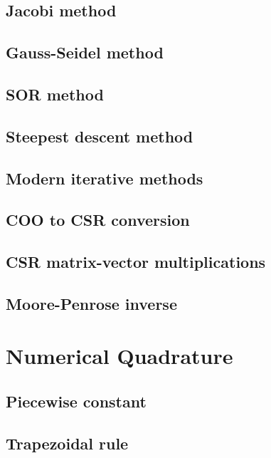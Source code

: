 \documentclass[article,A4,12pt]{llncs}
\begin{document}
\subsection{Jacobi method}


\subsection{Gauss-Seidel method}


\subsection{SOR method}


\subsection{Steepest descent method}


\subsection{Modern iterative methods}


\subsection{COO to CSR conversion}


\subsection{CSR matrix-vector multiplications}


\subsection{Moore-Penrose inverse}




\section{Numerical Quadrature}


\subsection{Piecewise constant}


\subsection{Trapezoidal rule}
\end{document}

